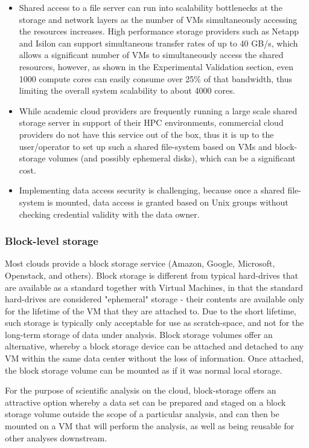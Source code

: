 \begin{itemize}
\item Shared access to a file server can run into scalability bottlenecks at the storage and network layers as the number of VMs simultaneously accessing the resources increases. High performance storage providers such as Netapp and Isilon can support simultaneous transfer rates of up to 40 GB/s, which allows a significant number of VMs to simultaneously access the shared resources, however, as shown in the Experimental Validation section, even 1000 compute cores can easily consume over 25\% of that bandwidth, thus limiting the overall system scalability to about 4000 cores.
\item While academic cloud providers are frequently running a large scale shared storage server in support of their HPC environments, commercial cloud providers do not have this service out of the box, thus it is up to the user/operator to set up such a shared file-system based on VMs and block-storage volumes (and possibly ephemeral disks), which can be a significant cost.
\item Implementing data access security is challenging, because once a shared file-system is mounted, data access is granted based on Unix groups without checking credential validity with the data owner.
\end{itemize}

\subsubsection{Block-level storage}

Most clouds provide a block storage service (Amazon, Google, Microsoft, Openstack, and others). Block storage is different from typical hard-drives that are available as a standard together with Virtual Machines, in that the standard hard-drives are considered "ephemeral" storage - their contents are available only for the lifetime of the VM that they are attached to. Due to the short lifetime, such storage is typically only acceptable for use as scratch-space, and not for the long-term storage of data under analysis. Block storage volumes offer an alternative, whereby a block storage device can be attached and detached to any VM within the same data center without the loss of information. Once attached, the block storage volume can be mounted as if it was normal local storage. 

For the purpose of scientific analysis on the cloud, block-storage offers an attractive option whereby a data set can be prepared and staged on a block storage volume outside the scope of a particular analysis, and can then be mounted on a VM that will perform the analysis, as well as being reusable for other analyses downstream. 

